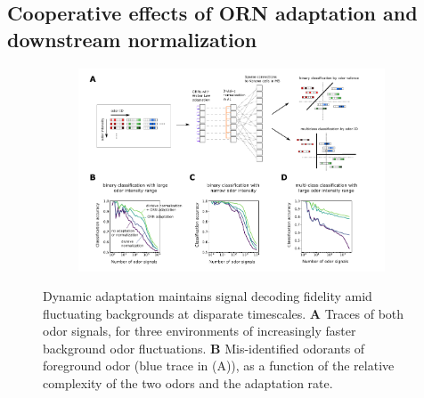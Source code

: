 \subsection{Cooperative effects of ORN adaptation and  downstream normalization}


\begin{figure}[!tb]
	\begin{subfigure}[t]{\linewidth}
		\includegraphics[width=\textwidth]{figures/6_downstream}
		\label{fig:downstream_a}	
	\end{subfigure}
	\begin{subfigure}[t]{0\linewidth}
		\label{fig:downstream_b}
	\end{subfigure}
	\begin{subfigure}[t]{0\linewidth}
		\label{fig:downstream_c}
	\end{subfigure}
	\begin{subfigure}[t]{0\linewidth}
		\label{fig:downstream_d}
	\end{subfigure}
	\caption{\footnotesize{Dynamic adaptation maintains signal decoding fidelity amid fluctuating backgrounds at disparate timescales. \textbf{A} Traces of both odor signals, for three environments of increasingly faster background odor fluctuations. \textbf{B} Mis-identified odorants of foreground odor (blue trace in (A)), as a function of the relative complexity of the two odors and the adaptation rate.}}
	\label{fig:downstream}
\end{figure}


